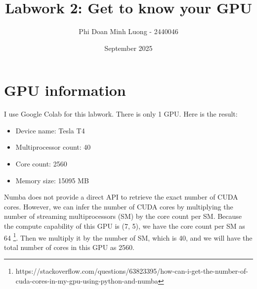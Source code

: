 \documentclass{article}
\title{Labwork 2: Get to know your GPU}
\author{Phi Doan Minh Luong - 2440046}
\date{September 2025}
\begin{document}
\maketitle

\setlength\parindent{0pt}

\section{GPU information}
I use Google Colab for this labwork. There is only 1 GPU. Here is the result:
\begin{itemize}
    \item Device name: Tesla T4
    \item Multiprocessor count: 40
    \item Core count: 2560
    \item Memory size: 15095 MB
\end{itemize}
Numba does not provide a direct API to retrieve the exact number of CUDA cores. However, we can infer the number of CUDA cores by multiplying the number of streaming multiprocessors (SM) by the core count per SM. Because the compute capability of this GPU is (7, 5), we have the core count per SM as 64 \footnote{https://stackoverflow.com/questions/63823395/how-can-i-get-the-number-of-cuda-cores-in-my-gpu-using-python-and-numba}. Then we multiply it by the number of SM, which is 40, and we will have the total number of cores in this GPU as 2560.
\end{document}
